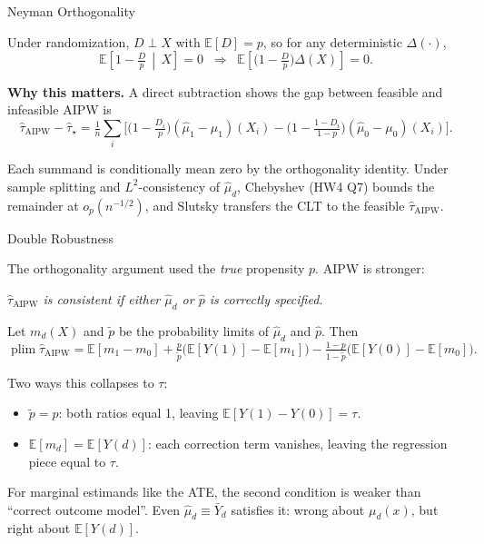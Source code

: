 \documentclass[aspectratio=169, handout, t]{beamer}
\newcommand{\plim}{\operatorname*{plim}}
\begin{document}
\begin{frame}{Neyman Orthogonality}

Under randomization, $D \perp X$ with $\mathbb{E}[D] = p$, so for any deterministic $\Delta(\cdot)$,
$$\mathbb{E}\!\left[1 - \tfrac{D}{p} \,\middle|\, X\right] = 0 \;\;\Longrightarrow\;\; \mathbb{E}\!\left[\big(1 - \tfrac{D}{p}\big)\Delta(X)\right] = 0.$$

\medskip
\textbf{Why this matters.}  A direct subtraction shows the gap between feasible and infeasible AIPW is
$$\hat\tau_{\mathrm{AIPW}} - \hat\tau_\star = \tfrac{1}{n}\sum_i \big[\big(1 - \tfrac{D_i}{p}\big)(\hat\mu_1 - \mu_1)(X_i) - \big(1 - \tfrac{1-D_i}{1-p}\big)(\hat\mu_0 - \mu_0)(X_i)\big].$$

Each summand is conditionally mean zero by the orthogonality identity.  Under sample splitting and $L^2$-consistency of $\hat\mu_d$, Chebyshev (HW4 Q7) bounds the remainder at $o_p(n^{-1/2})$, and Slutsky transfers the CLT to the feasible $\hat\tau_{\mathrm{AIPW}}$.

\end{frame}

\begin{frame}{Double Robustness}

The orthogonality argument used the \emph{true} propensity $p$.  AIPW is stronger:

\smallskip
\begin{center}
\textit{$\hat\tau_{\mathrm{AIPW}}$ is consistent if \alert{either} $\hat\mu_d$ or $\hat p$ is correctly specified.}
\end{center}

\smallskip
Let $m_d(X)$ and $\tilde p$ be the probability limits of $\hat\mu_d$ and $\hat p$.  Then
$$\plim \hat\tau_{\mathrm{AIPW}} = \mathbb{E}[m_1 - m_0] + \tfrac{p}{\tilde p}\big(\mathbb{E}[Y(1)] - \mathbb{E}[m_1]\big) - \tfrac{1-p}{1-\tilde p}\big(\mathbb{E}[Y(0)] - \mathbb{E}[m_0]\big).$$

Two ways this collapses to $\tau$:
\begin{itemize}\itemsep=2pt
\item $\tilde p = p$: both ratios equal 1, leaving $\mathbb{E}[Y(1) - Y(0)] = \tau$.
\item $\mathbb{E}[m_d] = \mathbb{E}[Y(d)]$: each correction term vanishes, leaving the regression piece equal to $\tau$.
\end{itemize}

\smallskip
For marginal estimands like the ATE, the second condition is weaker than ``correct outcome model''.  Even $\hat\mu_d \equiv \bar Y_d$ satisfies it: wrong about $\mu_d(x)$, but right about $\mathbb{E}[Y(d)]$.

\end{frame}
\end{document}
